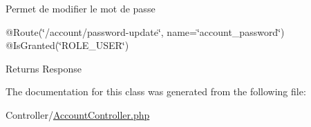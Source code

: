 Permet de modifier le mot de passe

@\+Route(\char`\"{}/account/password-\/update\char`\"{}, name=\char`\"{}account\+\_\+password\char`\"{}) @\+Is\+Granted(\char`\"{}\+R\+O\+L\+E\+\_\+\+U\+S\+E\+R\char`\"{})

\begin{DoxyReturn}{Returns}
Response 
\end{DoxyReturn}


The documentation for this class was generated from the following file\+:\begin{DoxyCompactItemize}
\item 
Controller/\mbox{\hyperlink{_account_controller_8php}{Account\+Controller.\+php}}\end{DoxyCompactItemize}
